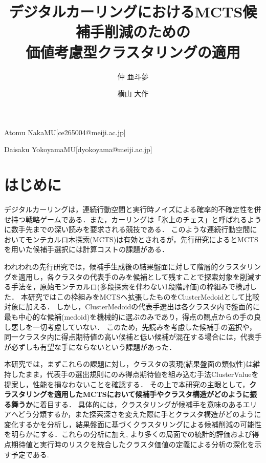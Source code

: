 \documentclass[submit,techrep,noauthor]{ipsj}
\begin{document}
\title{デジタルカーリングにおけるMCTS候補手削減のための\\価値考慮型クラスタリングの適用}



\author{仲 亜斗夢}{Atomu Naka}{MU}[ce265004@meiji.ac.jp]
\author{横山 大作}{Daisaku Yokoyama}{MU}[dyokoyama@meiji.ac.jp]

\maketitle

\section{はじめに}
デジタルカーリング\cite{dc3}は，連続行動空間と実行時ノイズによる確率的不確定性を併せ持つ戦略ゲームである．また，カーリングは「氷上のチェス」と呼ばれるように数手先までの深い読みを要求される競技である．
このような連続行動空間においてモンテカルロ木探索(MCTS)は有効とされるが，先行研究\cite{owatari2016,kato2016}によるとMCTSを用いた候補手選択には計算コストの課題がある．

われわれの先行研究\cite{naka_gi58}では，候補手生成後の結果盤面に対して階層的クラスタリングを適用し，各クラスタの代表手のみを候補として残すことで探索対象を削減する手法を，原始モンテカルロ(多段探索を伴わない1段階評価)の枠組みで検討した．
本研究ではこの枠組みをMCTSへ拡張したものをClusterMedoidとして比較対象に加える．
しかし，ClusterMedoidの代表手選出は各クラスタ内で盤面的に最も中心的な候補(medoid)を機械的に選ぶのみであり，得点の観点からの手の良し悪しを一切考慮していない．
このため，先読みを考慮した候補手の選択や，同一クラスタ内に得点期待値の高い候補と低い候補が混在する場合には，代表手が必ずしも有望な手にならないという課題があった．

本研究では，まずこれらの課題に対し，クラスタの表現(結果盤面の類似性)は維持したまま，代表手の選出規則にのみ得点期待値を組み込む手法ClusterValueを提案し，性能を損なわないことを確認する．
その上で本研究の主眼として，\textbf{クラスタリングを適用したMCTSにおいて候補手やクラスタ構造がどのように振る舞うか}に着目する．
具体的には，クラスタリングが候補手を意味のあるエリアへどう分類するか，また探索深さを変えた際に手とクラスタ構造がどのように変化するかを分析し，結果盤面に基づくクラスタリングによる候補削減の可能性を明らかにする．これらの分析に加え, より多くの局面での統計的評価および得点期待値と実行時のリスクを統合したクラスタ価値の定義による分析の深化を示す予定である.
\end{document}
